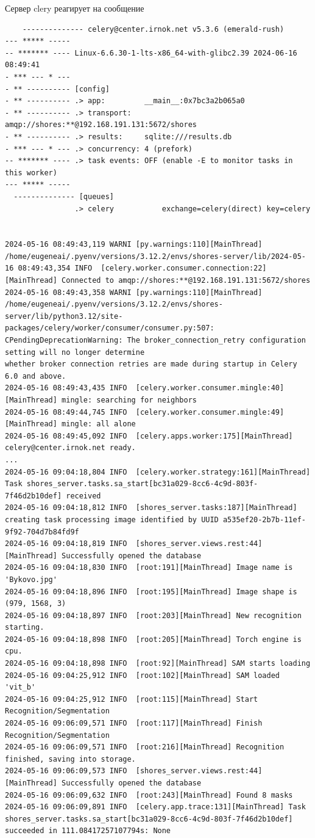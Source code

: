 \documentclass[732,fontsize=14pt,final]{studrep}
\begin{document}
Сервер clery реагирует на сообщение
\begin{verbatim}
    -------------- celery@center.irnok.net v5.3.6 (emerald-rush)
--- ***** -----
-- ******* ---- Linux-6.6.30-1-lts-x86_64-with-glibc2.39 2024-06-16 08:49:41
- *** --- * ---
- ** ---------- [config]
- ** ---------- .> app:         __main__:0x7bc3a2b065a0
- ** ---------- .> transport:   amqp://shores:**@192.168.191.131:5672/shores
- ** ---------- .> results:     sqlite:///results.db
- *** --- * --- .> concurrency: 4 (prefork)
-- ******* ---- .> task events: OFF (enable -E to monitor tasks in this worker)
--- ***** -----
  -------------- [queues]
                .> celery           exchange=celery(direct) key=celery


2024-05-16 08:49:43,119 WARNI [py.warnings:110][MainThread] /home/eugeneai/.pyenv/versions/3.12.2/envs/shores-server/lib/2024-05-16 08:49:43,354 INFO  [celery.worker.consumer.connection:22][MainThread] Connected to amqp://shores:**@192.168.191.131:5672/shores
2024-05-16 08:49:43,358 WARNI [py.warnings:110][MainThread] /home/eugeneai/.pyenv/versions/3.12.2/envs/shores-server/lib/python3.12/site-packages/celery/worker/consumer/consumer.py:507: CPendingDeprecationWarning: The broker_connection_retry configuration setting will no longer determine
whether broker connection retries are made during startup in Celery 6.0 and above.
2024-05-16 08:49:43,435 INFO  [celery.worker.consumer.mingle:40][MainThread] mingle: searching for neighbors
2024-05-16 08:49:44,745 INFO  [celery.worker.consumer.mingle:49][MainThread] mingle: all alone
2024-05-16 08:49:45,092 INFO  [celery.apps.worker:175][MainThread] celery@center.irnok.net ready.
...
2024-05-16 09:04:18,804 INFO  [celery.worker.strategy:161][MainThread] Task shores_server.tasks.sa_start[bc31a029-8cc6-4c9d-803f-7f46d2b10def] received
2024-05-16 09:04:18,812 INFO  [shores_server.tasks:187][MainThread] creating task processing image identified by UUID a535ef20-2b7b-11ef-9f92-704d7b84fd9f
2024-05-16 09:04:18,819 INFO  [shores_server.views.rest:44][MainThread] Successfully opened the database
2024-05-16 09:04:18,830 INFO  [root:191][MainThread] Image name is 'Bykovo.jpg'
2024-05-16 09:04:18,896 INFO  [root:195][MainThread] Image shape is (979, 1568, 3)
2024-05-16 09:04:18,897 INFO  [root:203][MainThread] New recognition starting.
2024-05-16 09:04:18,898 INFO  [root:205][MainThread] Torch engine is cpu.
2024-05-16 09:04:18,898 INFO  [root:92][MainThread] SAM starts loading
2024-05-16 09:04:25,912 INFO  [root:102][MainThread] SAM loaded 'vit_b'
2024-05-16 09:04:25,912 INFO  [root:115][MainThread] Start Recognition/Segmentation
2024-05-16 09:06:09,571 INFO  [root:117][MainThread] Finish Recognition/Segmentation
2024-05-16 09:06:09,571 INFO  [root:216][MainThread] Recognition finished, saving into storage.
2024-05-16 09:06:09,573 INFO  [shores_server.views.rest:44][MainThread] Successfully opened the database
2024-05-16 09:06:09,632 INFO  [root:243][MainThread] Found 8 masks
2024-05-16 09:06:09,891 INFO  [celery.app.trace:131][MainThread] Task shores_server.tasks.sa_start[bc31a029-8cc6-4c9d-803f-7f46d2b10def] succeeded in 111.08417257107794s: None
\end{verbatim}
\end{document}
